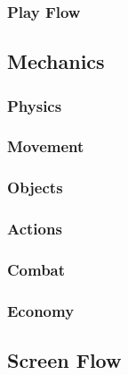 \documentclass[12pt,titlepage]{article}
\begin{document}
\subsubsection{Play Flow}

\subsection{Mechanics}

\subsubsection{Physics}

\subsubsection{Movement}

\subsubsection{Objects}

\subsubsection{Actions}

\subsubsection{Combat}

\subsubsection{Economy}

\subsection{Screen Flow}
\end{document}

